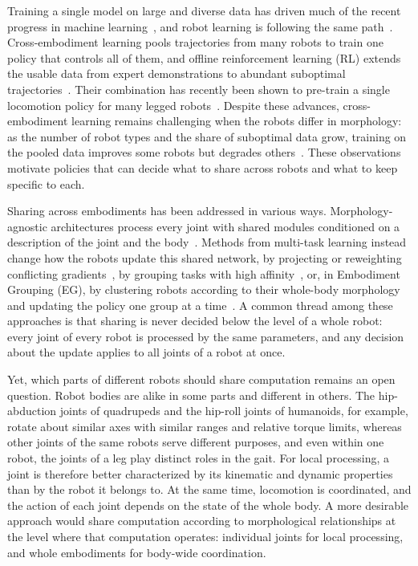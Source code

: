 Training a single model on large and diverse data has driven much of the recent progress in machine
learning~\citep{brown2020gpt3,radford2021clip}, and robot learning is following the same
path~\citep{oxe2024,octo2024,black2024pi0}. Cross-embodiment learning pools trajectories from many robots to train one
policy that controls all of them, and offline reinforcement learning (RL) extends the usable data from expert
demonstrations to abundant suboptimal trajectories~\citep{kumar2020cql,kostrikov2022iql,chebotar2023qtransformer}.
Their combination has recently been shown to pre-train a single locomotion policy for many legged
robots~\citep{abe2026crossembodimentoffline}. Despite these advances, cross-embodiment learning remains challenging
when the robots differ in morphology: as the number of robot types and the share of suboptimal data grow, training on
the pooled data improves some robots but degrades others~\citep{abe2026crossembodimentoffline}. These observations
motivate policies that can decide what to share across robots and what to keep specific to each.

Sharing across embodiments has been addressed in various ways. Morphology-agnostic architectures process every joint
with shared modules conditioned on a description of the joint and the
body~\citep{huang2020smp,gupta2022metamorph,bohlinger2024onepolicy}. Methods from multi-task learning instead change
how the robots update this shared network, by projecting or reweighting conflicting
gradients~\citep{yu2020pcgrad,navon2022nashmtl}, by grouping tasks with high affinity~\citep{jeong2025sel}, or, in
Embodiment Grouping (EG), by clustering robots according to their whole-body morphology and updating the policy one
group at a time~\citep{abe2026crossembodimentoffline}. A common thread among these approaches is that sharing is never
decided below the level of a whole robot: every joint of every robot is processed by the same parameters, and any
decision about the update applies to all joints of a robot at once.

Yet, which parts of different robots should share computation remains an open question. Robot bodies are alike in
some parts and different in others. The hip-abduction joints of quadrupeds and the hip-roll joints of humanoids, for
example, rotate about similar axes with similar ranges and relative torque limits, whereas other joints of the same
robots serve different purposes, and even within one robot, the joints of a leg play distinct roles in the gait. For
local processing, a joint is therefore better characterized by its kinematic and dynamic properties than by the robot
it belongs to. At the same time, locomotion is coordinated, and the action of each joint depends on the state of the
whole body. A more desirable approach would share computation according to morphological relationships at the level
where that computation operates: individual joints for local processing, and whole embodiments for body-wide
coordination.

